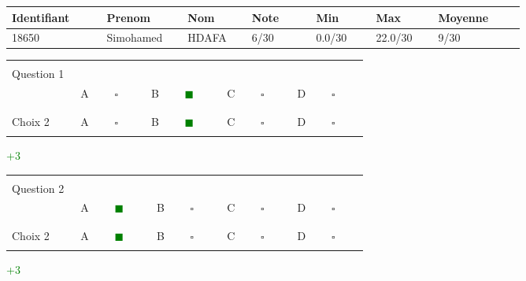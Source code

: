 \documentclass{book}%
\begin{document}
%
\normalsize%
\newpage%
\thispagestyle{empty}%
\begin{tabular}{|l|l|l|l|l|l|l| }%
\hline%
Identifiant $\qquad$ & Prenom $\qquad$ & Nom $\qquad$ & Note $\qquad$ & Min $\qquad$ & Max $\qquad$ & Moyenne $\qquad$ \\%
\hline%
18650&Simohamed&HDAFA&6/30&0.0/30 &22.0/30 & 9/30\\%
\hline%
\end{tabular}%
\thispagestyle{empty}%
\begin{center}%
\begin{tabular}{| l  l  l  l  l |}%
\hline%
 & & & & \\%
Question 1\qquad \qquad\ & & & & \\%
& A $\qquad \square \qquad$& B \textcolor{green}{$\qquad \blacksquare \qquad$}& C $\qquad \square \qquad$& D $\qquad \square \qquad$\\%
 & & & & \\%
\hline%
 & & & &  \\%
Choix 2& A $\qquad \square \qquad$& B \textcolor{green}{$\qquad \blacksquare \qquad$}& C $\qquad \square \qquad$& D $\qquad \square \qquad$\\%
 & & & &  \\%
\hline%
\end{tabular}%
 \qquad  \textcolor{green}{+3}%
\\ \vskip3mm%
\end{center}%
\thispagestyle{empty}%
\begin{center}%
\begin{tabular}{| l  l  l  l  l |}%
\hline%
 & & & & \\%
Question 2\qquad \qquad\ & & & & \\%
& A \textcolor{green}{$\qquad \blacksquare \qquad$}& B $\qquad \square \qquad$& C $\qquad \square \qquad$& D $\qquad \square \qquad$\\%
 & & & & \\%
\hline%
 & & & &  \\%
Choix 2& A \textcolor{green}{$\qquad \blacksquare \qquad$}& B $\qquad \square \qquad$& C $\qquad \square \qquad$& D $\qquad \square \qquad$\\%
 & & & &  \\%
\hline%
\end{tabular}%
 \qquad  \textcolor{green}{+3}%
\\ \vskip3mm%
\end{center}%
\thispagestyle{empty}%
\end{document}
